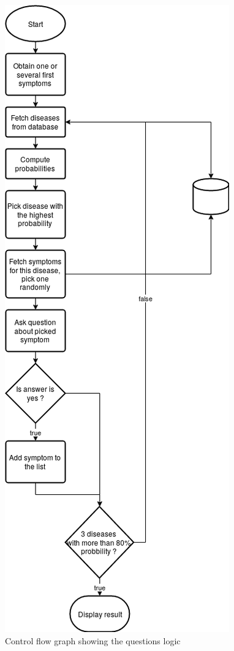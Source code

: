 \begin{figure}[H]
	\centering
	\includegraphics[height=0.9\textheight]{flow_chart_questions}
	\caption{Control flow graph showing the questions logic}
	\label{cfg_logic}
\end{figure}

